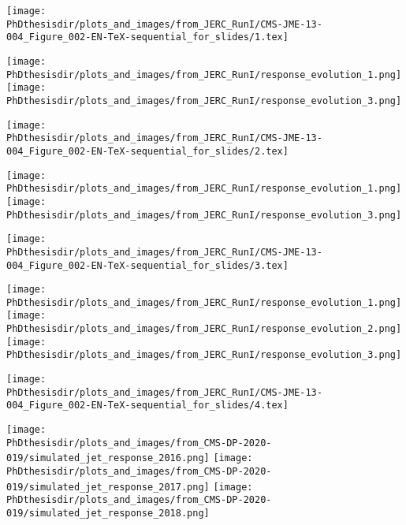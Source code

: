 \begin{frame}[t]
\large
\texttt{[image: \\PhDthesisdir/plots\_and\_images/from\_JERC\_RunI/CMS-JME-13-004\_Figure\_002-EN-TeX-sequential\_for\_slides/1.tex]}

\vfill

\texttt{[image: \\PhDthesisdir/plots\_and\_images/from\_JERC\_RunI/response\_evolution\_1.png]}
\hfill
\texttt{[image: \\PhDthesisdir/plots\_and\_images/from\_JERC\_RunI/response\_evolution\_3.png]}
\end{frame}

\begin{frame}[t]
\addtocounter{framenumber}{-1}
\large
\texttt{[image: \\PhDthesisdir/plots\_and\_images/from\_JERC\_RunI/CMS-JME-13-004\_Figure\_002-EN-TeX-sequential\_for\_slides/2.tex]}

\vfill

\texttt{[image: \\PhDthesisdir/plots\_and\_images/from\_JERC\_RunI/response\_evolution\_1.png]}
\hfill
\texttt{[image: \\PhDthesisdir/plots\_and\_images/from\_JERC\_RunI/response\_evolution\_3.png]}
\end{frame}

\begin{frame}[t]
\addtocounter{framenumber}{-1}
\large
\texttt{[image: \\PhDthesisdir/plots\_and\_images/from\_JERC\_RunI/CMS-JME-13-004\_Figure\_002-EN-TeX-sequential\_for\_slides/3.tex]}

\vfill

\texttt{[image: \\PhDthesisdir/plots\_and\_images/from\_JERC\_RunI/response\_evolution\_1.png]}
\hfill
\texttt{[image: \\PhDthesisdir/plots\_and\_images/from\_JERC\_RunI/response\_evolution\_2.png]}
\hfill
\texttt{[image: \\PhDthesisdir/plots\_and\_images/from\_JERC\_RunI/response\_evolution\_3.png]}
\end{frame}

\begin{frame}[t]
\addtocounter{framenumber}{-1}
\large
\texttt{[image: \\PhDthesisdir/plots\_and\_images/from\_JERC\_RunI/CMS-JME-13-004\_Figure\_002-EN-TeX-sequential\_for\_slides/4.tex]}

\vfill

\texttt{[image: \\PhDthesisdir/plots\_and\_images/from\_CMS-DP-2020-019/simulated\_jet\_response\_2016.png]}
\hfill
\texttt{[image: \\PhDthesisdir/plots\_and\_images/from\_CMS-DP-2020-019/simulated\_jet\_response\_2017.png]}
\hfill
\texttt{[image: \\PhDthesisdir/plots\_and\_images/from\_CMS-DP-2020-019/simulated\_jet\_response\_2018.png]}
\end{frame}

